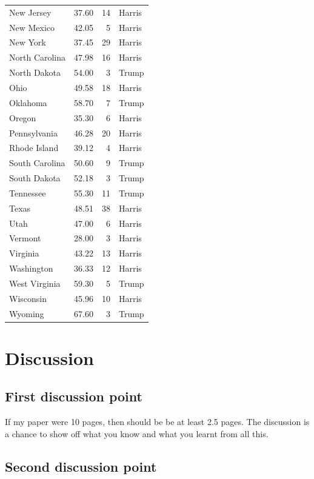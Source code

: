 \documentclass[
  letterpaper,
  DIV=11,
  numbers=noendperiod]{scrartcl}
\begin{document}
\begin{longtable}[]{@{}lrrl@{}}
New Jersey & 37.60 & 14 & Harris \\
New Mexico & 42.05 & 5 & Harris \\
New York & 37.45 & 29 & Harris \\
North Carolina & 47.98 & 16 & Harris \\
North Dakota & 54.00 & 3 & Trump \\
Ohio & 49.58 & 18 & Harris \\
Oklahoma & 58.70 & 7 & Trump \\
Oregon & 35.30 & 6 & Harris \\
Pennsylvania & 46.28 & 20 & Harris \\
Rhode Island & 39.12 & 4 & Harris \\
South Carolina & 50.60 & 9 & Trump \\
South Dakota & 52.18 & 3 & Trump \\
Tennessee & 55.30 & 11 & Trump \\
Texas & 48.51 & 38 & Harris \\
Utah & 47.00 & 6 & Harris \\
Vermont & 28.00 & 3 & Harris \\
Virginia & 43.22 & 13 & Harris \\
Washington & 36.33 & 12 & Harris \\
West Virginia & 59.30 & 5 & Trump \\
Wisconsin & 45.96 & 10 & Harris \\
Wyoming & 67.60 & 3 & Trump \\

\end{longtable}

\section{Discussion}\label{discussion}

\subsection{First discussion point}\label{sec-first-point}

If my paper were 10 pages, then should be be at least 2.5 pages. The
discussion is a chance to show off what you know and what you learnt
from all this.

\subsection{Second discussion point}\label{second-discussion-point}
\end{document}

